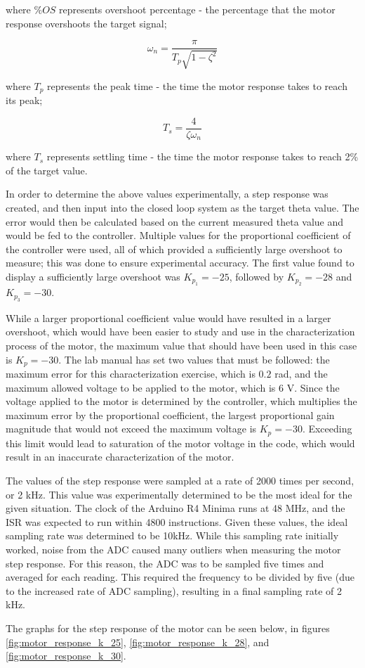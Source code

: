 \documentclass[11pt, letterpaper]{article}
\begin{document}
where $\%OS$ represents overshoot percentage - the percentage that the motor
response overshoots the target signal;

\begin{equation}
    \omega_n = \frac{\pi}{T_p \sqrt{1-\zeta^2}}
    \label{eq:omega_n_formula}
\end{equation}

where $T_p$ represents the peak time - the time the motor response takes
to reach its peak;

\begin{equation}
    T_s = \frac{4}{\zeta \omega_n}
\end{equation}

where $T_s$ represents settling time - the time the motor response takes
to reach 2\% of the target value. \par

In order to determine the above values experimentally, a step response was
created, and then input into the closed loop system as the target theta
value. The error would then be calculated based on the current measured
theta value and would be fed to the controller. Multiple values for
the proportional coefficient of the controller were used, all of
which provided a sufficiently large overshoot to measure; this was done to
ensure experimental accuracy. The first value found to display a sufficiently
large overshoot was $K_{p_1} = -25$, followed by $K_{p_2} = -28$ and
$K_{p_3} = -30$.\par
While a larger proportional coefficient value would have resulted in a larger
overshoot, which would have been easier to study and use in the characterization
process of the motor, the maximum value that should have been used in this case
is $K_p = -30$. The lab manual has set two values that must be followed: the
maximum error for this characterization exercise, which is $0.2$ rad, and the
maximum allowed voltage to be applied to the motor, which is $6$ V. Since the
voltage applied to the motor is determined by the controller, which multiplies
the maximum error by the proportional coefficient, the largest proportional gain
magnitude that would not exceed the maximum voltage is $K_p = -30$. Exceeding
this limit would lead to saturation of the motor voltage in the code, which would
result in an inaccurate characterization of the motor. \par
The values of the step response were sampled at a rate of 2000 times per
second, or 2 kHz. This value was experimentally determined to
be the most ideal for the given situation. The clock of the Arduino R4 Minima runs at 48 MHz, and the ISR was expected to run within 4800 instructions.
Given these values, the ideal sampling rate was determined to
be 10kHz. While this sampling rate initially worked,
noise from the ADC caused many outliers when measuring
the motor step response. For this reason, the ADC was to be sampled five times and
averaged for each reading. This required the frequency to be divided by five (due to
the increased rate of ADC sampling), resulting in a final sampling rate of 2 kHz. \par
The graphs for the step response of the motor can be seen below, in figures
\ref{fig:motor_response_k_25}, \ref{fig:motor_response_k_28}, and
\ref{fig:motor_response_k_30}.
\end{document}
